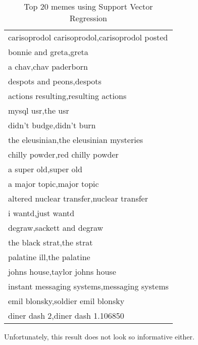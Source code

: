 \documentclass{sig-alternate}
\begin{document}
\begin{table*}[h!b!p!]
\begin{center}
\begin{tabular}{|p{15cm}|}
\hline
carisoprodol carisoprodol,carisoprodol posted\\
bonnie and greta,greta\\
a chav,chav paderborn\\
despots and peons,despots\\
actions resulting,resulting actions\\
mysql usr,the usr\\
didn't budge,didn't burn\\
the eleusinian,the eleusinian mysteries\\
chilly powder,red chilly powder\\
a super old,super old\\
a major topic,major topic\\
altered nuclear transfer,nuclear transfer\\
i wantd,just wantd\\
degraw,sackett and degraw\\
the black strat,the strat\\
palatine ill,the palatine\\
johns house,taylor johns house\\
instant messaging systems,messaging systems\\
emil blonsky,soldier emil blonsky\\
diner dash 2,diner dash 1.106850\\
\hline
\end{tabular}
\caption{Top 20 memes using Support Vector Regression}
\label{table:svr_result}
\end{center}
\end{table*}

Unfortunately, this result does not look so informative either.
\end{document}
